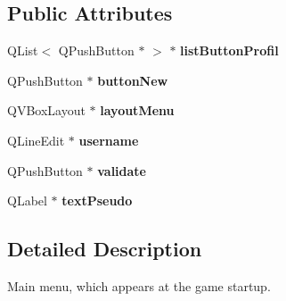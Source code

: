\subsection*{Public Attributes}
\begin{DoxyCompactItemize}
\item 
\hypertarget{class_w___menu_start_aa2206920f3ba0841ded6b2360131764e}{}Q\+List$<$ Q\+Push\+Button $\ast$ $>$ $\ast$ {\bfseries list\+Button\+Profil}\label{class_w___menu_start_aa2206920f3ba0841ded6b2360131764e}

\item 
\hypertarget{class_w___menu_start_a92e6b7e7860d623aa8417fa5471a106a}{}Q\+Push\+Button $\ast$ {\bfseries button\+New}\label{class_w___menu_start_a92e6b7e7860d623aa8417fa5471a106a}

\item 
\hypertarget{class_w___menu_start_a20adaa510f2b53261e6cfa3fed4e040e}{}Q\+V\+Box\+Layout $\ast$ {\bfseries layout\+Menu}\label{class_w___menu_start_a20adaa510f2b53261e6cfa3fed4e040e}

\item 
\hypertarget{class_w___menu_start_a6c752b6f0bd351a0ef46dc950655b35c}{}Q\+Line\+Edit $\ast$ {\bfseries username}\label{class_w___menu_start_a6c752b6f0bd351a0ef46dc950655b35c}

\item 
\hypertarget{class_w___menu_start_ad7033d974516740eff5db51bf0445721}{}Q\+Push\+Button $\ast$ {\bfseries validate}\label{class_w___menu_start_ad7033d974516740eff5db51bf0445721}

\item 
\hypertarget{class_w___menu_start_a7410f32bb3db08dfc0cebd6aa2f09fa8}{}Q\+Label $\ast$ {\bfseries text\+Pseudo}\label{class_w___menu_start_a7410f32bb3db08dfc0cebd6aa2f09fa8}

\end{DoxyCompactItemize}


\subsection{Detailed Description}
Main menu, which appears at the game startup. 

